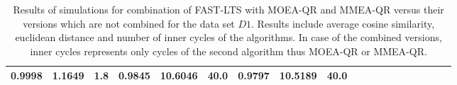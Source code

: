 \documentclass[thesis=B,english]{FITthesis}[2012/10/20]
\begin{document}
\begin{table}[h!]
\begin{adjustbox}{angle=90}
{\begin{tabular}{l|l|l|l|r|r|r|r|r|r|r|r|r|r|r|r|r|r|r|}
       0.9998 &  1.1649 &   1.8 &  0.9845 &  10.6046 &  40.0 &  0.9797 &  10.5189 &  40.0 \\
    \hline
    \end{tabular}
    }
			
\end{adjustbox}
    
    \caption{Results of simulations for combination of FAST-LTS with MOEA-QR and MMEA-QR versus their versions which are not combined for the data set $D1$. Results include average cosine similarity, euclidean distance and number of inner cycles of the algorithms. In case of the combined versions, inner cycles represents only cycles of the second algorithm thus MOEA-QR or MMEA-QR.}
    \label{table:combined:1}
\end{table}
\end{document}
